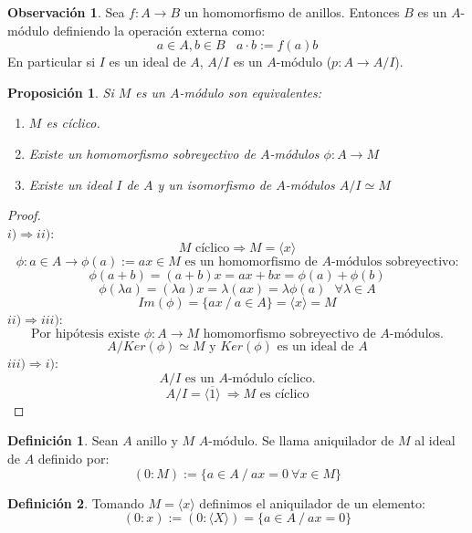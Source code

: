 \documentclass{article}
\theoremstyle{theorem-style}  %
\newtheorem{proposition}[theorem]{Proposición}
\theoremstyle{definition}
\newtheorem{definition}{Definición}[section]
\newtheorem*{observation}{Observación} %
\theoremstyle{example-style}
\begin{document}
	\begin{observation}
		Sea $f:A\rightarrow B$ un homomorfismo de anillos. Entonces $B$ es un $A$-módulo definiendo la operación
		externa como:\[
			a\in A,b\in B \ \ \ \ a\cdot b :=f(a)b
		\]
		En particular si $I$ es un ideal de $A$, $A/I$ es un $A$-módulo ($p:A\rightarrow A/I$).
	\end{observation}

	\begin{proposition}
		Si $M$ es un $A$-módulo son equivalentes:
		\begin{enumerate}[\hspace{1cm}i)]
			\item $M$ es cíclico.
			\item Existe un homomorfismo sobreyectivo de $A$-módulos $\phi :A\rightarrow M$
			\item Existe un ideal $I$ de $A$ y un isomorfismo de $A$-módulos $A/I \simeq M$
		\end{enumerate}
	\end{proposition}

	\begin{proof} \ \\
		$i)\Rightarrow ii)$:
		\[ M \text{ cíclico}\Rightarrow M=\langle x\rangle\]
		\[ \phi :a \in A\rightarrow \phi (a):=ax \in M \text{ es un homomorfismo de $A$-módulos sobreyectivo:}\]
		\[ \phi(a+b)=(a+b)x=ax+bx=\phi(a)+\phi(b)\]
		\[ \phi(\lambda a)=(\lambda a)x= \lambda(ax)=\lambda\phi(a) \ \ \ \forall\lambda\in A \]
		\[ Im(\phi)=\{ax \ / \ a\in A \} = \langle x\rangle=M\]
		$ii)\Rightarrow iii)$:
		\[ \text{Por hipótesis existe } \phi:A\rightarrow M \text{ homomorfismo sobreyectivo de $A$-módulos.}\]
		\[ A/Ker(\phi) \simeq M \text{ y $Ker(\phi)$ es un ideal de } A \]
		$iii)\Rightarrow i)$:
		\[ A/I \text{ es un $A$-módulo cíclico.} \]
		\[ A/I=\langle \overline{1}\rangle\ \Rightarrow\text{$M$ es cíclico} \]
	\end{proof}

	\begin{definition}
		Sean $A$ anillo y $M$ $A$-módulo. Se llama aniquilador de $M$ al ideal de $A$ definido por:
		\[(0:M):=\{a\in A \ / \ ax=0 \  \forall x \in M\}\]
	\end{definition}

	\begin{definition}
		Tomando $M=\langle x\rangle$ definimos el aniquilador de un elemento:
		\[(0:x):=(0:\langle X\rangle)=\{a\in A \ / \ ax=0\}\]
	\end{definition}
\end{document}
